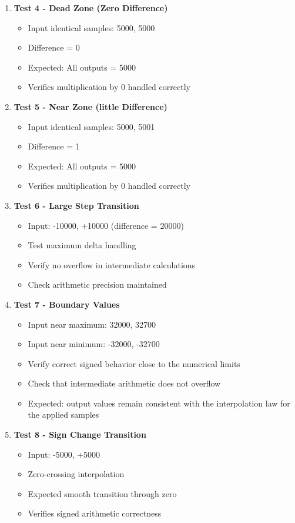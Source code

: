 \documentclass[a4paper,11pt]{article}
\begin{document}
\begin{enumerate}
    \item \textbf{Test 4 - Dead Zone (Zero Difference)}
    \begin{itemize}
        \item Input identical samples: 5000, 5000
        \item Difference = 0
        \item Expected: All outputs = 5000
        \item Verifies multiplication by 0 handled correctly
    \end{itemize}
    \item \textbf{Test 5 - Near Zone (little Difference)}
    \begin{itemize}
        \item Input identical samples: 5000, 5001
        \item Difference = 1
        \item Expected: All outputs = 5000
        \item Verifies multiplication by 0 handled correctly
    \end{itemize}
    

    
    \item \textbf{Test 6 - Large Step Transition}
    \begin{itemize}
        \item Input: -10000, +10000 (difference = 20000)
        \item Test maximum delta handling
        \item Verify no overflow in intermediate calculations
        \item Check arithmetic precision maintained
    \end{itemize}
    
    \item \textbf{Test 7 - Boundary Values}
    \begin{itemize}
        \item Input near maximum: 32000, 32700
        \item Input near minimum: -32000, -32700
        \item Verify correct signed behavior close to the numerical limits
        \item Check that intermediate arithmetic does not overflow
        \item Expected: output values remain consistent with the interpolation law for the applied samples
    \end{itemize}
    
    \item \textbf{Test 8 - Sign Change Transition}
    \begin{itemize}
        \item Input: -5000, +5000
        \item Zero-crossing interpolation
        \item Expected smooth transition through zero
        \item Verifies signed arithmetic correctness
    \end{itemize}
\end{enumerate}
\end{document}
